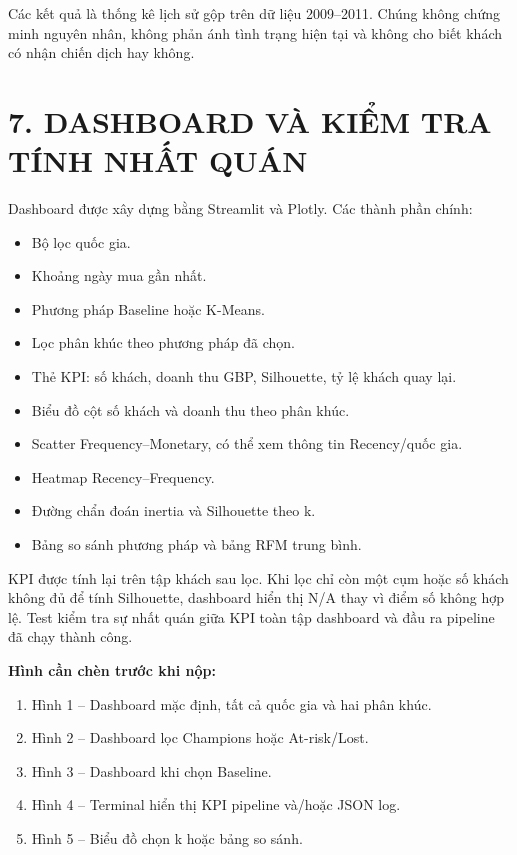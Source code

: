 \documentclass[a4paper]{article}
\begin{document}
Các kết quả là thống kê lịch sử gộp trên dữ liệu 2009--2011. Chúng không chứng minh nguyên nhân, không phản ánh tình trạng hiện tại và không cho biết khách có nhận chiến dịch hay không.


\section*{7. DASHBOARD VÀ KIỂM TRA TÍNH NHẤT QUÁN}

Dashboard được xây dựng bằng Streamlit và Plotly. Các thành phần chính:

\begin{itemize}
\item Bộ lọc quốc gia.
\item Khoảng ngày mua gần nhất.
\item Phương pháp Baseline hoặc K-Means.
\item Lọc phân khúc theo phương pháp đã chọn.
\item Thẻ KPI: số khách, doanh thu GBP, Silhouette, tỷ lệ khách quay lại.
\item Biểu đồ cột số khách và doanh thu theo phân khúc.
\item Scatter Frequency--Monetary, có thể xem thông tin Recency/quốc gia.
\item Heatmap Recency--Frequency.
\item Đường chẩn đoán inertia và Silhouette theo k.
\item Bảng so sánh phương pháp và bảng RFM trung bình.
\end{itemize}

KPI được tính lại trên tập khách sau lọc. Khi lọc chỉ còn một cụm hoặc số khách không đủ để tính Silhouette, dashboard hiển thị N/A thay vì điểm số không hợp lệ. Test kiểm tra sự nhất quán giữa KPI toàn tập dashboard và đầu ra pipeline đã chạy thành công.

\textbf{Hình cần chèn trước khi nộp:}

\begin{enumerate}
\item Hình 1 -- Dashboard mặc định, tất cả quốc gia và hai phân khúc.
\item Hình 2 -- Dashboard lọc Champions hoặc At-risk/Lost.
\item Hình 3 -- Dashboard khi chọn Baseline.
\item Hình 4 -- Terminal hiển thị KPI pipeline và/hoặc JSON log.
\item Hình 5 -- Biểu đồ chọn k hoặc bảng so sánh.
\end{enumerate}
\end{document}
